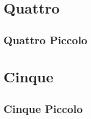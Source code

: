 \documentclass{article}
\begin{document}
{ }

 
{\vspace*{1cm}} \section{Quattro}

{ }

\subsection{Quattro Piccolo}

{ }


{\vspace*{.5cm}} 
\section{Cinque}

\subsection{Cinque Piccolo}

{ }

%
%

%



\printbibliography

%
\end{document}
